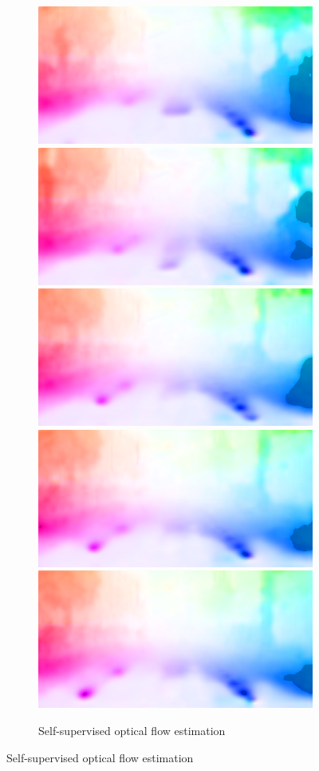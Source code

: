\begin{figure}[t]
\begin{subfigure}[t]{\linewidth}
\begin{center}
\includegraphics[width=0.19\linewidth]{seq/image_000086_000001_flow.png}
\includegraphics[width=0.19\linewidth]{seq/image_000086_000004_flow.png}
\includegraphics[width=0.19\linewidth]{seq/image_000086_000007_flow.png}
\includegraphics[width=0.19\linewidth]{seq/image_000086_000008_flow.png}
\includegraphics[width=0.19\linewidth]{seq/image_000086_000009_flow.png}
\vspace{-2mm}
  \caption{Self-supervised optical flow estimation}
\end{center}
\end{subfigure}


\end{figure}
